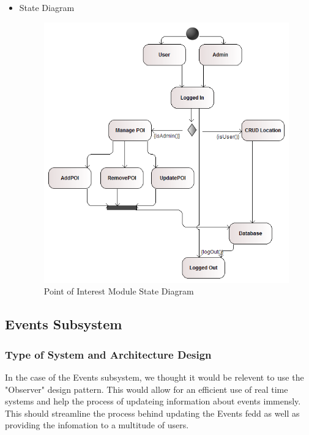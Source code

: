 \documentclass{article}
\begin{document}
\begin{itemize}
 				\item State Diagram
 				\begin{center}
 					\begin{figure}[!h]
 						\includegraphics[scale=0.6]{POI_State_Machine_diagram.png}
 						\caption{Point of Interest Module State Diagram}
 					\end{figure}
 				\end{center}
 		\end{itemize}
 				
 		
		\subsection{Events Subsystem}
		\subsubsection{Type of System and Architecture Design}
				In the case of the Events subsystem, we thought it would be relevent to use the "Observer" design pattern. This would allow for an efficient use of real time systems and help the process of updateing information about events immensly. This should streamline the process behind updating the Events fedd as well as providing the infomation to a multitude of users. 
				
\end{document}

